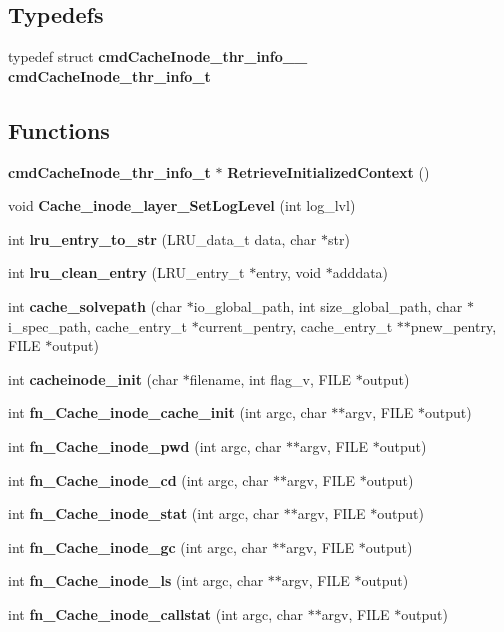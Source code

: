 \subsection*{Typedefs}
\begin{CompactItemize}
\item 
typedef struct {\bf cmdCacheInode\_\-thr\_\-info\_\-\_\-} {\bf cmdCacheInode\_\-thr\_\-info\_\-t}
\end{CompactItemize}
\subsection*{Functions}
\begin{CompactItemize}
\item 
{\bf cmdCacheInode\_\-thr\_\-info\_\-t} $\ast$ {\bf RetrieveInitializedContext} ()
\item 
void {\bf Cache\_\-inode\_\-layer\_\-SetLogLevel} (int log\_\-lvl)
\item 
int {\bf lru\_\-entry\_\-to\_\-str} (LRU\_\-data\_\-t data, char $\ast$str)
\item 
int {\bf lru\_\-clean\_\-entry} (LRU\_\-entry\_\-t $\ast$entry, void $\ast$adddata)
\item 
int {\bf cache\_\-solvepath} (char $\ast$io\_\-global\_\-path, int size\_\-global\_\-path, char $\ast$i\_\-spec\_\-path, cache\_\-entry\_\-t $\ast$current\_\-pentry, cache\_\-entry\_\-t $\ast$$\ast$pnew\_\-pentry, FILE $\ast$output)
\item 
int {\bf cacheinode\_\-init} (char $\ast$filename, int flag\_\-v, FILE $\ast$output)
\item 
int {\bf fn\_\-Cache\_\-inode\_\-cache\_\-init} (int argc, char $\ast$$\ast$argv, FILE $\ast$output)
\item 
int {\bf fn\_\-Cache\_\-inode\_\-pwd} (int argc, char $\ast$$\ast$argv, FILE $\ast$output)
\item 
int {\bf fn\_\-Cache\_\-inode\_\-cd} (int argc, char $\ast$$\ast$argv, FILE $\ast$output)
\item 
int {\bf fn\_\-Cache\_\-inode\_\-stat} (int argc, char $\ast$$\ast$argv, FILE $\ast$output)
\item 
int {\bf fn\_\-Cache\_\-inode\_\-gc} (int argc, char $\ast$$\ast$argv, FILE $\ast$output)
\item 
int {\bf fn\_\-Cache\_\-inode\_\-ls} (int argc, char $\ast$$\ast$argv, FILE $\ast$output)
\item 
int {\bf fn\_\-Cache\_\-inode\_\-callstat} (int argc, char $\ast$$\ast$argv, FILE $\ast$output)
\item 

\end{CompactItemize}
